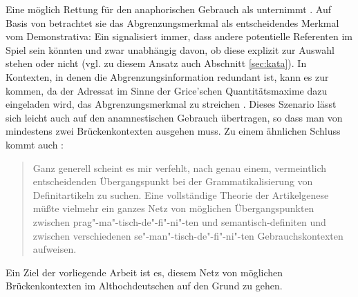Eine möglich Rettung für den anaphorischen  Gebrauch als  unternimmt  
\textcite{Schlachter2015}. Auf Basis von \textcite{Bisle-Muller1991} betrachtet sie das Abgrenzungsmerkmal als entscheidendes Merkmal vom Demonstrativa: Ein  signalisiert immer, dass andere potentielle Referenten im Spiel sein könnten und zwar unabhängig davon, ob diese explizit zur Auswahl stehen oder nicht (vgl. zu diesem Ansatz auch  Abschnitt \ref{sec:kata}). In Kontexten, in denen die Abgrenzungsinformation redundant ist, kann es zur  kommen, da der Adressat im Sinne der Grice'schen Quantitätsmaxime \parencite[Mache deinen Beitrag nicht informativer als notwendig,][]{Grice1975} dazu eingeladen wird, das Abgrenzungsmerkmal zu streichen \parencite{Schlachter2015}. Dieses Szenario lässt sich leicht auch auf den anamnestischen  Gebrauch übertragen, so dass man von mindestens zwei Brückenkontexten  ausgehen muss. Zu einem ähnlichen Schluss kommt auch \textcite{Himmelmann1997}: 

\blockcquote[96]{Himmelmann1997}{
Ganz generell scheint es mir verfehlt, nach genau einem, vermeintlich entscheidenden
Übergangspunkt bei der Grammatikalisierung  von Definitartikeln  zu suchen. Eine vollständige
Theorie der Artikelgenese müßte vielmehr ein ganzes Netz von möglichen Übergangspunkten
zwischen prag"-ma"-tisch-de"-fi"-ni"-ten und semantisch-definiten  und zwischen verschiedenen
se"-man"-tisch-de"-fi"-ni"-ten Gebrauchskontexten aufweisen.} 

\noindent
Ein Ziel der vorliegende Arbeit ist es, diesem Netz von möglichen Brückenkontexten  im Althochdeutschen auf den Grund zu gehen. 


